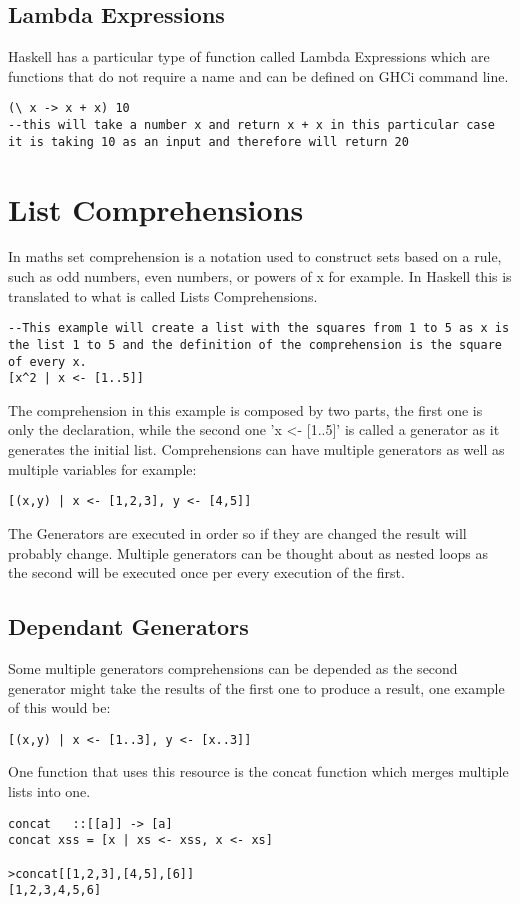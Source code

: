 \documentclass[12pt, oneside]{article}
\begin{document}
\subsection{Lambda Expressions}
Haskell has a particular type of function called Lambda Expressions which are functions that do not require a name and can be defined on GHCi command line.
\begin{lstlisting}
(\ x -> x + x) 10
--this will take a number x and return x + x in this particular case it is taking 10 as an input and therefore will return 20
\end{lstlisting}
\section{List Comprehensions}
In maths set comprehension is a notation used to construct sets based on a rule, such as odd numbers, even numbers, or powers of x for example. In Haskell this is translated to what is called Lists Comprehensions.
\begin{lstlisting}
--This example will create a list with the squares from 1 to 5 as x is the list 1 to 5 and the definition of the comprehension is the square of every x.
[x^2 | x <- [1..5]]
\end{lstlisting}
The comprehension in this example is composed by two parts, the first one is only the declaration, while the second one 'x <- [1..5]' is called a generator as it generates the initial list. Comprehensions can have multiple generators as well as multiple variables for example:
\begin{lstlisting}
[(x,y) | x <- [1,2,3], y <- [4,5]] \end{lstlisting}
The Generators are executed in order so if they are changed the result will probably change. Multiple generators can be thought about as nested loops as the second will be executed once per every execution of the first.
\subsection{Dependant Generators}
Some multiple generators comprehensions can be depended as the second generator might take the results of the first one to produce a result, one example of this would be:
\begin{lstlisting}
[(x,y) | x <- [1..3], y <- [x..3]]
\end{lstlisting}
One function that uses this resource is the concat function which merges multiple lists into one.
\begin{lstlisting}
concat   ::[[a]] -> [a]
concat xss = [x | xs <- xss, x <- xs]

>concat[[1,2,3],[4,5],[6]]
[1,2,3,4,5,6]
\end{lstlisting}
\end{document}
